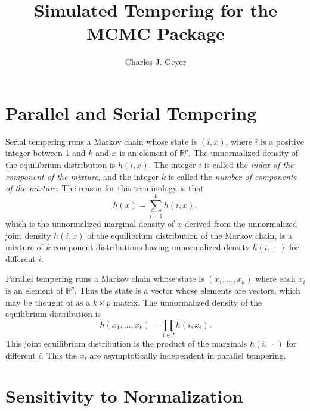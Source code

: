 \documentclass[11pt]{article}
\newcommand{\real}{\mathbb{R}}
\newcommand{\fatdot}{\,\cdot\,}
\begin{document}
\title{Simulated Tempering for the MCMC Package}

\author{Charles J. Geyer}

\maketitle

\section{Parallel and Serial Tempering}

Serial tempering \citep{marinari-parisi,geyer-thompson}
runs a Markov chain whose state is $(i, x)$, where $i$
is a positive integer between 1 and $k$ and $x$ is an element of $\real^p$.
The unnormalized density of the equilibrium distribution is $h(i, x)$.
The integer $i$ is called the \emph{index of the component of the mixture},
and the integer $k$ is called the \emph{number of components of the mixture}.
The reason for this terminology is that
\begin{equation} \label{eq:mix}
   h(x) = \sum_{i = 1}^k h(i, x),
\end{equation}
which is the unnormalized marginal density of $x$ derived from the unnormalized
joint density $h(i, x)$ of the equilibrium distribution of the Markov chain,
is a mixture of $k$ component distributions having unnormalized density
$h(i, \fatdot)$ for different $i$.

Parallel tempering \citep{geyer}
runs a Markov chain whose state is $(x_1, \ldots, x_k)$
where each $x_i$ is an element of $\real^p$.  Thus the state is a vector
whose elements are vectors, which may be thought of as a $k \times p$ matrix.
The unnormalized density of the equilibrium distribution is
\begin{equation} \label{eq:parallel-joint}
   h(x_1, \ldots, x_k) = \prod_{i \in I} h(i, x_i).
\end{equation}
This joint equilibrium distribution is the product of the marginals
$h(i, \fatdot)$ for different $i$.  This the $x_i$ are asymptotically
independent in parallel tempering.

\section{Sensitivity to Normalization}
\end{document}
